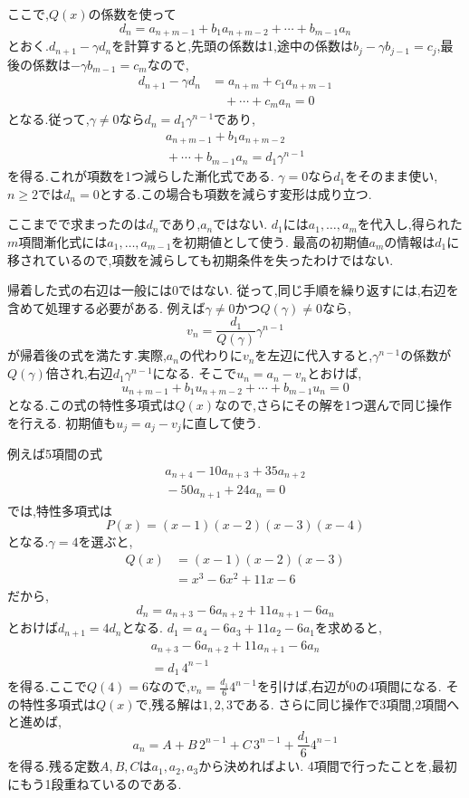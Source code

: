 ここで,$Q(x)$の係数を使って
\[
  d_n=a_{n+m-1}+b_1a_{n+m-2}+\cdots+b_{m-1}a_n
\]
とおく.$d_{n+1}-\gamma d_n$を計算すると,先頭の係数は1,途中の係数は$b_j-\gamma b_{j-1}=c_j$,最後の係数は$-\gamma b_{m-1}=c_m$なので,
\[
  \begin{aligned}
    d_{n+1}-\gamma d_n
      &=a_{n+m}+c_1a_{n+m-1}\\
      &\quad{}+\cdots+c_ma_n=0
  \end{aligned}
\]
となる.従って,$\gamma\ne0$なら$d_n=d_1\gamma^{n-1}$であり,
\[
  \begin{aligned}
    a_{n+m-1}+b_1a_{n+m-2}\\
    {}+\cdots+b_{m-1}a_n=d_1\gamma^{n-1}
  \end{aligned}
\]
を得る.これが項数を1つ減らした漸化式である.
$\gamma=0$なら$d_1$をそのまま使い,$n\ge2$では$d_n=0$とする.この場合も項数を減らす変形は成り立つ.

ここまでで求まったのは$d_n$であり,$a_n$ではない.
$d_1$には$a_1,\ldots,a_m$を代入し,得られた$m$項間漸化式には$a_1,\ldots,a_{m-1}$を初期値として使う.
最高の初期値$a_m$の情報は$d_1$に移されているので,項数を減らしても初期条件を失ったわけではない.

帰着した式の右辺は一般には0ではない.
従って,同じ手順を繰り返すには,右辺を含めて処理する必要がある.
例えば$\gamma\ne0$かつ$Q(\gamma)\ne0$なら,
\[
  v_n=\frac{d_1}{Q(\gamma)}\gamma^{n-1}
\]
が帰着後の式を満たす.実際,$a_n$の代わりに$v_n$を左辺に代入すると,$\gamma^{n-1}$の係数が$Q(\gamma)$倍され,右辺$d_1\gamma^{n-1}$になる.
そこで$u_n=a_n-v_n$とおけば,
\[
  u_{n+m-1}+b_1u_{n+m-2}+\cdots+b_{m-1}u_n=0
\]
となる.この式の特性多項式は$Q(x)$なので,さらにその解を1つ選んで同じ操作を行える.
初期値も$u_j=a_j-v_j$に直して使う.

例えば5項間の式
\[
  \begin{aligned}
    a_{n+4}-10a_{n+3}+35a_{n+2}\\
    {}-50a_{n+1}+24a_n=0
  \end{aligned}
\]
では,特性多項式は
\[
  P(x)=(x-1)(x-2)(x-3)(x-4)
\]
となる.$\gamma=4$を選ぶと,
\[
  \begin{aligned}
    Q(x)&=(x-1)(x-2)(x-3)\\
        &=x^3-6x^2+11x-6
  \end{aligned}
\]
だから,
\[
  d_n=a_{n+3}-6a_{n+2}+11a_{n+1}-6a_n
\]
とおけば$d_{n+1}=4d_n$となる.
$d_1=a_4-6a_3+11a_2-6a_1$を求めると,
\[
  \begin{aligned}
    a_{n+3}-6a_{n+2}+11a_{n+1}-6a_n\\
    {}=d_1\,4^{n-1}
  \end{aligned}
\]
を得る.ここで$Q(4)=6$なので,$v_n=\frac{d_1}{6}4^{n-1}$を引けば,右辺が0の4項間になる.
その特性多項式は$Q(x)$で,残る解は$1,2,3$である.
さらに同じ操作で3項間,2項間へと進めば,
\[
  a_n=A+B\,2^{n-1}+C\,3^{n-1}+\frac{d_1}{6}4^{n-1}
\]
を得る.残る定数$A,B,C$は$a_1,a_2,a_3$から決めればよい.
4項間で行ったことを,最初にもう1段重ねているのである.

